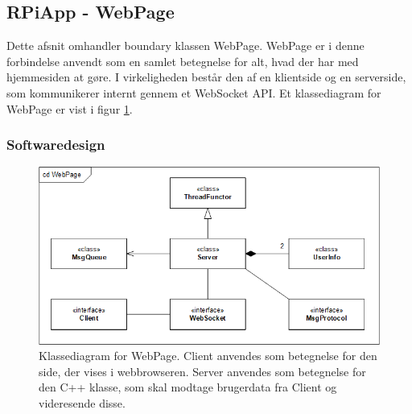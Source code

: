 \documentclass[Rapport/Rapport_main.tex]{subfiles}
\begin{document}
\subsection{RPiApp - WebPage}
Dette afsnit omhandler boundary klassen WebPage. WebPage er i denne forbindelse anvendt som en samlet betegnelse for alt, hvad der har med hjemmesiden at gøre. I virkeligheden består den af en klientside og en serverside, som kommunikerer internt gennem et WebSocket API. Et klassediagram for WebPage er vist i figur \ref{fig:WebPage_class_diagram}.

\subsubsection{Softwaredesign}
\begin{figure}[H]
    \centering
    \includegraphics[width=1\textwidth]{Softwaredesign/RPiApp/graphic_RPi/cd_WebPage.png}
    \caption{Klassediagram for WebPage. Client anvendes som betegnelse for den side, der vises i webbrowseren. Server anvendes som betegnelse for den C++ klasse, som skal modtage brugerdata fra Client og videresende disse.}
    \label{fig:WebPage_class_diagram}
\end{figure}
\end{document}
